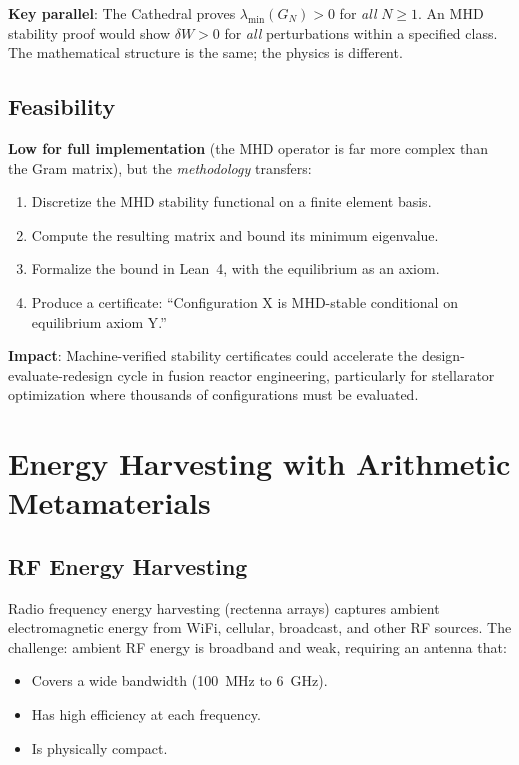 \documentclass[11pt,a4paper]{article}
\begin{document}
\textbf{Key parallel}: The Cathedral proves $\lambda_{\min}(G_N) > 0$
for \emph{all} $N \geq 1$. An MHD stability proof would show
$\delta W > 0$ for \emph{all} perturbations within a specified class.
The mathematical structure is the same; the physics is different.

\subsection{Feasibility}

\textbf{Low for full implementation} (the MHD operator is far more
complex than the Gram matrix), but the \emph{methodology} transfers:

\begin{enumerate}
  \item Discretize the MHD stability functional on a finite element
    basis.
  \item Compute the resulting matrix and bound its minimum eigenvalue.
  \item Formalize the bound in Lean~4, with the equilibrium as an
    axiom.
  \item Produce a certificate: ``Configuration X is MHD-stable
    conditional on equilibrium axiom Y.''
\end{enumerate}

\textbf{Impact}: Machine-verified stability certificates could
accelerate the design-evaluate-redesign cycle in fusion reactor
engineering, particularly for stellarator optimization where
thousands of configurations must be evaluated.

\section{Energy Harvesting with Arithmetic Metamaterials}
\label{sec:harvesting}

\subsection{RF Energy Harvesting}

Radio frequency energy harvesting (rectenna arrays) captures ambient
electromagnetic energy from WiFi, cellular, broadcast, and other RF
sources. The challenge: ambient RF energy is broadband and weak,
requiring an antenna that:
\begin{itemize}
  \item Covers a wide bandwidth (100~MHz to 6~GHz).
  \item Has high efficiency at each frequency.
  \item Is physically compact.
\end{itemize}
\end{document}
